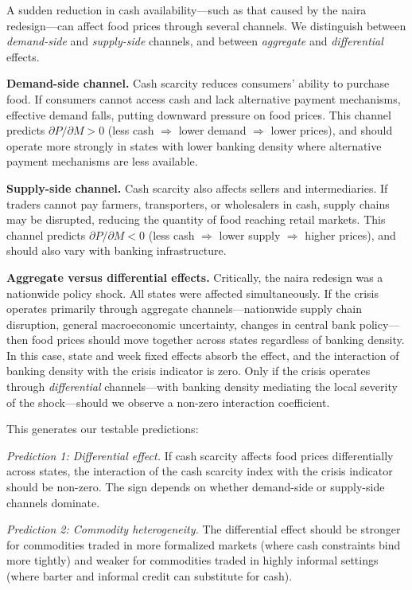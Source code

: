 \documentclass[12pt]{article}
\begin{document}
A sudden reduction in cash availability---such as that caused by the naira redesign---can affect food prices through several channels. We distinguish between \textit{demand-side} and \textit{supply-side} channels, and between \textit{aggregate} and \textit{differential} effects.

\textbf{Demand-side channel.} Cash scarcity reduces consumers' ability to purchase food. If consumers cannot access cash and lack alternative payment mechanisms, effective demand falls, putting downward pressure on food prices. This channel predicts $\partial P / \partial M > 0$ (less cash $\Rightarrow$ lower demand $\Rightarrow$ lower prices), and should operate more strongly in states with lower banking density where alternative payment mechanisms are less available.

\textbf{Supply-side channel.} Cash scarcity also affects sellers and intermediaries. If traders cannot pay farmers, transporters, or wholesalers in cash, supply chains may be disrupted, reducing the quantity of food reaching retail markets. This channel predicts $\partial P / \partial M < 0$ (less cash $\Rightarrow$ lower supply $\Rightarrow$ higher prices), and should also vary with banking infrastructure.

\textbf{Aggregate versus differential effects.} Critically, the naira redesign was a nationwide policy shock. All states were affected simultaneously. If the crisis operates primarily through aggregate channels---nationwide supply chain disruption, general macroeconomic uncertainty, changes in central bank policy---then food prices should move together across states regardless of banking density. In this case, state and week fixed effects absorb the effect, and the interaction of banking density with the crisis indicator is zero. Only if the crisis operates through \textit{differential} channels---with banking density mediating the local severity of the shock---should we observe a non-zero interaction coefficient.

This generates our testable predictions:

\textit{Prediction 1: Differential effect.} If cash scarcity affects food prices differentially across states, the interaction of the cash scarcity index with the crisis indicator should be non-zero. The sign depends on whether demand-side or supply-side channels dominate.

\textit{Prediction 2: Commodity heterogeneity.} The differential effect should be stronger for commodities traded in more formalized markets (where cash constraints bind more tightly) and weaker for commodities traded in highly informal settings (where barter and informal credit can substitute for cash).
\end{document}
